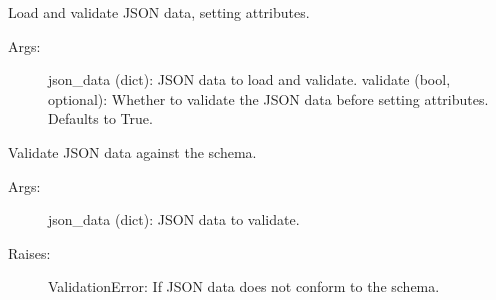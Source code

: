 \documentclass[letterpaper,10pt,english]{sphinxmanual}
\begin{document}
\begin{fulllineitems}
\begin{fulllineitems}
\label{\detokenize{eda_schema:eda_schema.base.BaseEntity.load}}
\pysigstartsignatures
{}
\pysigstopsignatures
\sphinxAtStartPar
Load and validate JSON data, setting attributes.
\begin{description}
\item[{Args:}] \leavevmode
\sphinxAtStartPar
json\_data (dict): JSON data to load and validate.
validate (bool, optional): Whether to validate the JSON data before setting attributes. Defaults to True.

\end{description}

\end{fulllineitems}


\begin{fulllineitems}
\label{\detokenize{eda_schema:eda_schema.base.BaseEntity.validate}}
\pysigstartsignatures
{}
\pysigstopsignatures
\sphinxAtStartPar
Validate JSON data against the schema.
\begin{description}
\item[{Args:}] \leavevmode
\sphinxAtStartPar
json\_data (dict): JSON data to validate.

\item[{Raises:}] \leavevmode
\sphinxAtStartPar
ValidationError: If JSON data does not conform to the schema.

\end{description}

\end{fulllineitems}


\end{fulllineitems}

\end{document}

